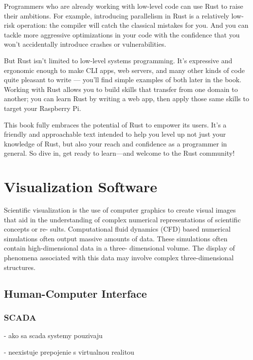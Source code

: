 Programmers who are already working with low-level code can use Rust to raise their ambitions. For example, introducing parallelism in Rust is a relatively low-risk operation: the compiler will catch the classical mistakes for you. And you can tackle more aggressive optimizations in your code with the confidence that you won’t accidentally introduce crashes or vulnerabilities.

But Rust isn’t limited to low-level systems programming. It’s expressive and ergonomic enough to make CLI apps, web servers, and many other kinds of code quite pleasant to write — you’ll find simple examples of both later in the book. Working with Rust allows you to build skills that transfer from one domain to another; you can learn Rust by writing a web app, then apply those same skills to target your Raspberry Pi.

This book fully embraces the potential of Rust to empower its users. It’s a friendly and approachable text intended to help you level up not just your knowledge of Rust, but also your reach and confidence as a programmer in general. So dive in, get ready to learn—and welcome to the Rust community!

\cite{steveklabnik2018}

\section{Visualization Software}

Scientific visualization is the use of computer graphics to create visual images that aid in the understanding of complex numerical representations of scientific concepts or re- sults. Computational fluid dynamics (CFD) based numerical simulations often output massive amounts of data. These simulations often contain high-dimensional data in a three- dimensional volume. The display of phenomena associated with this data may involve complex three-dimensional structures.

\subsection{Human-Computer Interface}

\subsubsection{SCADA}

- ako sa scada systemy pouzivaju

- neexistuje prepojenie s virtualnou realitou

